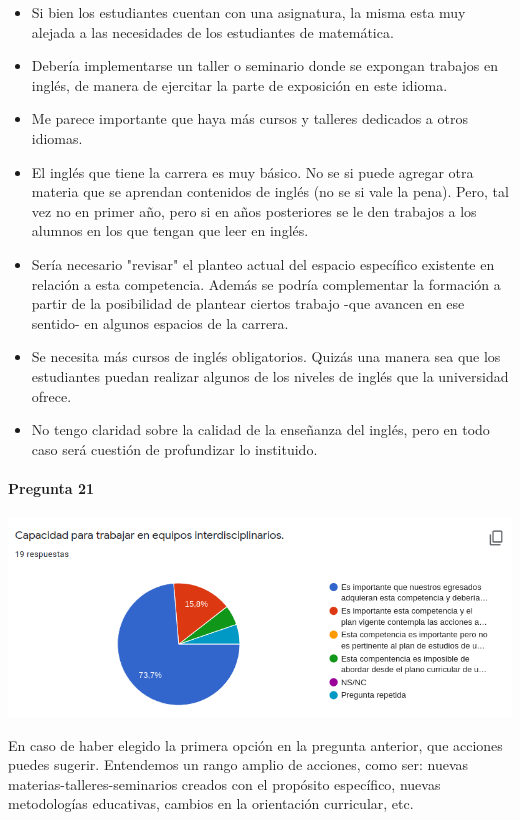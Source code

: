 \documentclass[a4paper,10pt,BCOR10mm,oneside,headsepline]{scrbook}
\begin{document}
\begin{subappendices}
\begin{itemize}
\item Si bien los estudiantes cuentan con una asignatura, la misma esta muy alejada a las necesidades de  los estudiantes de matemática.  

\item Debería implementarse un taller o seminario donde se expongan trabajos en inglés, de manera de ejercitar la parte de exposición en este idioma.

\item Me parece importante que haya más cursos y talleres dedicados a otros idiomas.

\item El inglés que tiene la carrera es muy básico. No se si puede agregar otra materia que se aprendan contenidos de inglés (no se si vale la pena). Pero, tal vez no en primer año, pero si en años posteriores se le den trabajos a los alumnos en los que tengan que leer en inglés.

\item Sería necesario "revisar" el planteo actual del espacio específico existente en relación a esta competencia. Además se podría complementar la formación a partir de la posibilidad de plantear ciertos trabajo -que avancen en ese sentido- en algunos espacios de la carrera.

\item Se necesita más cursos de inglés obligatorios. Quizás una manera sea que los estudiantes puedan realizar algunos de los niveles de inglés que la universidad ofrece.  

\item No tengo claridad sobre la calidad de la enseñanza del inglés, pero en todo caso será cuestión de profundizar lo instituido.

\end{itemize}


     \paragraph{Pregunta 21}
\begin{center}
 
\includegraphics[scale=.9]{doc21.png}
 \end{center}
 En caso de haber elegido la primera opción en la pregunta anterior, que acciones puedes sugerir. Entendemos un rango amplio de acciones, como ser: nuevas materias-talleres-seminarios creados con el propósito específico, nuevas metodologías educativas, cambios en la orientación curricular, etc. 
 

\end{subappendices}
\end{document}
